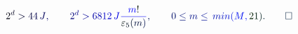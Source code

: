 \documentclass[12pt]{article}
\begin{document}
\makeatletter
\renewcommand*{\@textcolor}[3]{%
  \protect\leavevmode
  \begingroup
    \color#1{#2}#3%
  \endgroup
}
\makeatother
\begin{displaymath}
\mathcolor[RGB]{0,0,15}{2} ^ { \mathcolor[RGB]{0,0,30}{d} } \mathcolor[RGB]{0,0,45}{>} \mathcolor[RGB]{0,0,60}{4} \mathcolor[RGB]{0,0,75}{4} \, \mathcolor[RGB]{0,0,90}{J} \mathcolor[RGB]{0,0,105}{,} \qquad \mathcolor[RGB]{0,0,120}{2} ^ { \mathcolor[RGB]{0,0,135}{d} } \mathcolor[RGB]{0,0,150}{>} \mathcolor[RGB]{0,0,165}{6} \mathcolor[RGB]{0,0,180}{8} \mathcolor[RGB]{0,0,195}{1} \mathcolor[RGB]{0,0,210}{2} \, \mathcolor[RGB]{0,0,225}{J} \mathcolor[RGB]{0,0,240}{\frac { \mathcolor[RGB]{0,0,255}{m} \mathcolor[RGB]{0,15,0}{!} } { \mathcolor[RGB]{0,15,15}{\varepsilon} _ { \mathcolor[RGB]{0,15,30}{5} } \mathcolor[RGB]{0,15,45}{(} \mathcolor[RGB]{0,15,60}{m} \mathcolor[RGB]{0,15,75}{)} } } \mathcolor[RGB]{0,15,90}{,} \qquad \mathcolor[RGB]{0,15,105}{0} \mathcolor[RGB]{0,15,120}{\leq} \mathcolor[RGB]{0,15,135}{m} \mathcolor[RGB]{0,15,150}{\leq} \mathcolor[RGB]{0,15,165}{\operatorname*} { \mathcolor[RGB]{0,15,180}{m} \mathcolor[RGB]{0,15,195}{i} \mathcolor[RGB]{0,15,210}{n} } \mathcolor[RGB]{0,15,225}{(} \mathcolor[RGB]{0,15,240}{M} \mathcolor[RGB]{0,15,255}{,} \mathcolor[RGB]{0,30,0}{2} \mathcolor[RGB]{0,30,15}{1} \mathcolor[RGB]{0,30,30}{)} \mathcolor[RGB]{0,30,45}{.} \mathcolor[RGB]{0,30,60}{\qedhere}
\end{displaymath}
\end{document}
